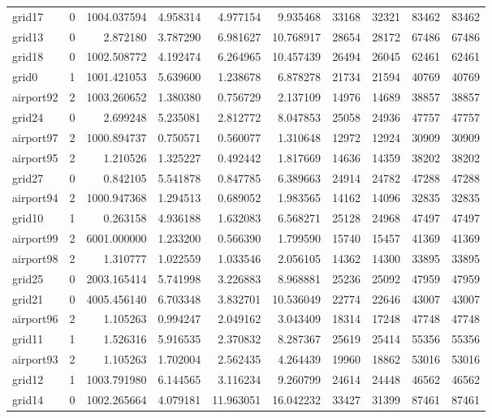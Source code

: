 \begin{longtable}{|l|r|r|r|r|r|r|r|r|r|}
grid17 & 0 & 1004.037594 & 4.958314 & 4.977154 & 9.935468 & 33168 & 32321 & 83462 & 83462 \\
grid13 & 0 & 2.872180 & 3.787290 & 6.981627 & 10.768917 & 28654 & 28172 & 67486 & 67486 \\
grid18 & 0 & 1002.508772 & 4.192474 & 6.264965 & 10.457439 & 26494 & 26045 & 62461 & 62461 \\
grid0 & 1 & 1001.421053 & 5.639600 & 1.238678 & 6.878278 & 21734 & 21594 & 40769 & 40769 \\
airport92 & 2 & 1003.260652 & 1.380380 & 0.756729 & 2.137109 & 14976 & 14689 & 38857 & 38857 \\
grid24 & 0 & 2.699248 & 5.235081 & 2.812772 & 8.047853 & 25058 & 24936 & 47757 & 47757 \\
airport97 & 2 & 1000.894737 & 0.750571 & 0.560077 & 1.310648 & 12972 & 12924 & 30909 & 30909 \\
airport95 & 2 & 1.210526 & 1.325227 & 0.492442 & 1.817669 & 14636 & 14359 & 38202 & 38202 \\
grid27 & 0 & 0.842105 & 5.541878 & 0.847785 & 6.389663 & 24914 & 24782 & 47288 & 47288 \\
airport94 & 2 & 1000.947368 & 1.294513 & 0.689052 & 1.983565 & 14162 & 14096 & 32835 & 32835 \\
grid10 & 1 & 0.263158 & 4.936188 & 1.632083 & 6.568271 & 25128 & 24968 & 47497 & 47497 \\
airport99 & 2 & 6001.000000 & 1.233200 & 0.566390 & 1.799590 & 15740 & 15457 & 41369 & 41369 \\
airport98 & 2 & 1.310777 & 1.022559 & 1.033546 & 2.056105 & 14362 & 14300 & 33895 & 33895 \\
grid25 & 0 & 2003.165414 & 5.741998 & 3.226883 & 8.968881 & 25236 & 25092 & 47959 & 47959 \\
grid21 & 0 & 4005.456140 & 6.703348 & 3.832701 & 10.536049 & 22774 & 22646 & 43007 & 43007 \\
airport96 & 2 & 1.105263 & 0.994247 & 2.049162 & 3.043409 & 18314 & 17248 & 47748 & 47748 \\
grid11 & 1 & 1.526316 & 5.916535 & 2.370832 & 8.287367 & 25619 & 25414 & 55356 & 55356 \\
airport93 & 2 & 1.105263 & 1.702004 & 2.562435 & 4.264439 & 19960 & 18862 & 53016 & 53016 \\
grid12 & 1 & 1003.791980 & 6.144565 & 3.116234 & 9.260799 & 24614 & 24448 & 46562 & 46562 \\
grid14 & 0 & 1002.265664 & 4.079181 & 11.963051 & 16.042232 & 33427 & 31399 & 87461 & 87461 \\

\end{longtable}
